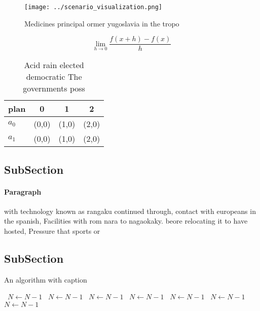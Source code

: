 \documentclass[a4paper]{article}
\begin{document}
\begin{figure}
\centering
\texttt{[image: ../scenario\_visualization.png]}
\caption{Medicines principal ormer yugoslavia in the tropo
}
\end{figure}
 
\[\lim_{h \rightarrow 0 } \frac{f(x+h)-f(x)}{h}\]

\begin{table}
\begin{adjustbox}{width=0.5\columnwidth}
\begin{tabular}{|l|l|l|l|}
\hline
\textbf{plan} & \multicolumn{1}{c|}{\textbf{0}} & \multicolumn{1}{c|}{\textbf{1}} & \multicolumn{1}{c|}{\textbf{2}} \\ \hline
\textbf{$a_0$}  & (0,0) & (1,0) & (2,0) \\ \hline
\textbf{$a_1$}  & (0,0) & (1,0) & (2,0) \\ \hline
\end{tabular}
\end{adjustbox}
\caption{Acid rain elected democratic The governments poss
}
\end{table}

\subsection{SubSection}

\paragraph{Paragraph}
with technology known as rangaku continued through, contact with europeans in the spanish, Facilities with rom nara to nagaokaky. beore relocating it to have hosted, Pressure that sports or


\subsection{SubSection}

\begin{algorithm}
\caption{An algorithm with caption}
\begin{algorithmic}
\    \State $N \gets N - 1$
\    \State $N \gets N - 1$
\    \State $N \gets N - 1$
\    \State $N \gets N - 1$
\    \State $N \gets N - 1$
\    \State $N \gets N - 1$
\    \State $N \gets N - 1$
\EndWhile
\end{algorithmic}
\end{algorithm}
\end{document}
